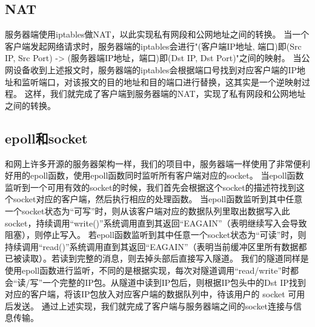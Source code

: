 \subsection{NAT}
服务器端使用iptables做NAT，以此实现私有网段和公网地址之间的转换。
当一个客户端发起网络请求时，服务器端的iptables会进行"(客户端IP地址, 端口)即(Src IP, Src Port) -> (服务器端IP地址，端口)即(Dst IP, Dst Port)"之间的映射。 
当公网设备收到上述报文时，服务器端的iptables会根据端口号找到对应客户端的IP地址和监听端口，对该报文的目的地址和目的端口进行替换，这其实是一个逆映射过程。
这样，我们就完成了客户端到服务器端的NAT，实现了私有网段和公网地址之间的转换。

\subsection{epoll和socket}
和网上许多开源的服务器架构一样，我们的项目中，服务器端一样使用了非常便利好用的epoll函数，使用epoll函数同时监听所有客户端对应的socket。
当epoll函数监听到一个可用有效的socket的时候，我们首先会根据这个socket的描述符找到这个socket对应的客户端，然后执行相应的处理函数。
当epoll函数监听到其中任意一个socket状态为“可写”时，则从该客户端对应的数据队列里取出数据写入此socket，持续调用“write()”系统调用直到其返回“EAGAIN”（表明继续写入会导致阻塞），则停止写入。
若epoll函数监听到其中任意一个socket状态为“可读”时，则持续调用“read()”系统调用直到其返回“EAGAIN”（表明当前缓冲区里所有数据都已被读取）。若读到完整的消息，则去掉头部后直接写入隧道。 
我们的隧道同样是使用epoll函数进行监听，不同的是根据实现，每次对隧道调用“read/write”时都会“读/写”一个完整的IP包。从隧道中读到IP包后，则根据IP包头中的Dst IP找到对应的客户端，将该IP包放入对应客户端的数据队列中，待该用户的 socket 可用后发送。
通过上述实现，我们就完成了客户端与服务器端之间的socket连接与信息传输。
